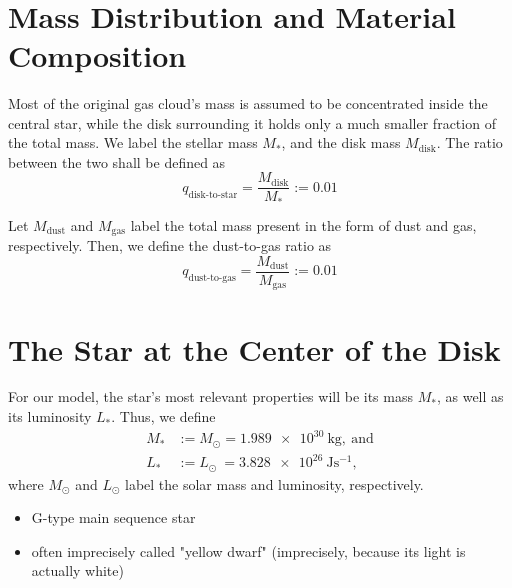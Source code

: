      \\

\clearpage\section{Mass Distribution and Material Composition}

   Most of the original gas cloud's mass is assumed to be concentrated inside the central star,
   while the disk surrounding it holds only a much smaller fraction of the total mass. 
   We label the stellar mass $M_*$, and the disk mass $M_\text{disk}$. 
   The ratio between the two shall be defined as
   \begin{equation}
       q_\text{disk-to-star}
           =\frac{M_\text{disk}}{M_*}  
           :=0.01
   \end{equation}

    Let $M_\text{dust}$ and $M_\text{gas}$ label the total mass present in the form of dust and 
    gas, respectively. Then, we define the dust-to-gas ratio as 
    \begin{equation}
        q_\text{dust-to-gas}=\frac{M_\text{dust}}{M_\text{gas}}:=0.01
    \end{equation}

\section{The Star at the Center of the Disk}

    For our model, the star's most relevant properties will be its mass $M_*$, as well as its
    luminosity $L_*$.  Thus, we define
    \begin{align}
        M_*&:=M_\odot=\SI{1.989e30}{\kg},\ \text{and} \\
        L_*&:=L_\odot\ =\SI{3.828e26}{\joule\second^{-1}},
    \end{align}
    where $M_\odot$ and $L_\odot$ label the solar mass and luminosity, respectively. \\

    \begin{itemize}
        \item G-type main sequence star
        \item often imprecisely called "yellow dwarf" 
              (imprecisely, because its light is actually white)
    \end{itemize}
     \\

